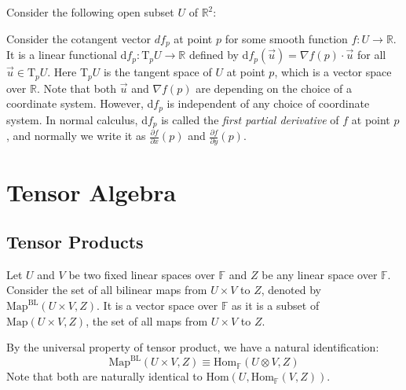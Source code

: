 \documentclass[
	11pt, %
	fleqn, %
	a4paper, %
]{LegrandOrangeBook}
\newcommand{\Hom}{\text{Hom}} %
\newcommand{\F}{\mathbb{F}} %
\newcommand{\Map}{\text{Map}} %
\newcommand{\R}{\mathbb{R}} %
\begin{document}
\begin{example}
    Consider the following open subset $U$ of $\R^2$:
    \begin{center}
	\end{center}
    Consider the cotangent vector $df_p$ at point $p$ for some smooth function $f : U \to \R$. It is a linear functional d$f_p : \text{T}_p U \to \R$ defined by d$f_p(\vec{u}) = \nabla f(p) \cdot \vec{u}$ for all $\vec{u} \in \text{T}_p U$. Here T$_p U$ is the tangent space of $U$ at point $p$, which is a vector space over $\R$. Note that both $\vec{u}$ and $\nabla f(p)$ are depending on the choice of a coordinate system. However, d$f_p$ is independent of any choice of coordinate system. In normal calculus, d$f_p$ is called the \emph{first partial derivative} of $f$ at point $p$, and normally we write it as $\frac{\partial f}{\partial x}(p)$ and $\frac{\partial f}{\partial y}(p)$.
\end{example}

\chapter{Tensor Algebra}

\section{Tensor Products}

Let $U$ and $V$ be two fixed linear spaces over $\F$ and $Z$ be any linear space over $\F$. Consider the set of all bilinear maps from $U \times V$ to $Z$, denoted by $\Map^{\text{BL}}(U \times V, Z)$. It is a vector space over $\F$ as it is a subset of $\Map(U \times V, Z)$, the set of all maps from $U \times V$ to $Z$.

By the universal property of tensor product, we have a natural identification:
\[
    \Map^{\text{BL}}(U \times V, Z) \equiv \Hom_{\F}(U \otimes V, Z)
\]
Note that both are naturally identical to $\Hom(U, \Hom_{\F}(V, Z))$.
\end{document}
